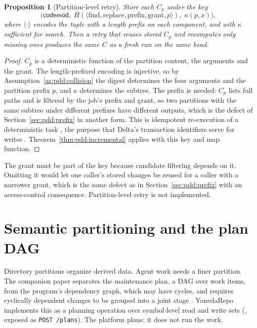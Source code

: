 \documentclass[11pt,letterpaper]{article}
\newtheorem{proposition}[theorem]{Proposition}
\theoremstyle{definition}
\theoremstyle{remark}
\DeclareRobustCommand{\code}[1]{{\def\_{\textunderscore\allowbreak}\texttt{#1}}}
\begin{document}
\begin{proposition}[Partition-level retry]
\label{prop:pdd:retry}
Store each $C_p$ under the key
\[
\bigl(\textsf{codemod},\;H(\langle\text{find},\text{replace},\text{prefix},\text{grant},p\rangle),\;\kappa(p,x)\bigr),
\]
where $\langle\cdot\rangle$ encodes the tuple with a length prefix on each component, and with $\kappa$ sufficient for search. Then a retry that reuses stored $C_p$ and recomputes only missing ones produces the same $C$ as a fresh run on the same head.
\end{proposition}

\begin{proof}
$C_p$ is a deterministic function of the partition content, the arguments and the grant. The length-prefixed encoding is injective, so by Assumption~\ref{as:pdd:collision} the digest determines the four arguments and the partition prefix $p$, and $\kappa$ determines the subtree. The prefix is needed: $C_p$ lists full paths and is filtered by the job's prefix and grant, so two partitions with the same subtree under different prefixes have different outputs, which is the defect of Section~\ref{sec:pdd:prefix} in another form. This is idempotent re-execution of a deterministic task \cite[Section~3.3]{dean2004mapreduce}, the purpose that Delta's transaction identifiers serve for writes \cite{deltaprotocol}. Theorem~\ref{thm:pdd:incremental} applies with this key and map function.
\end{proof}

The grant must be part of the key because candidate filtering depends on it. Omitting it would let one caller's stored changes be reused for a caller with a narrower grant, which is the same defect as in Section~\ref{sec:pdd:prefix} with an access-control consequence. Partition-level retry is not implemented.

\section{Semantic partitioning and the plan DAG}
\label{sec:pdd:plan}

Directory partitions organize derived data. Agent work needs a finer partition. The companion paper separates the maintenance plan, a DAG over work items, from the program's dependency graph, which may have cycles, and requires cyclically dependent changes to be grouped into a joint stage \cite{long2026inversion}. YonedaRepo implements this as a planning operation over symbol-level read and write sets (, exposed as \code{POST /plans}). The platform plans; it does not run the work.
\end{document}
